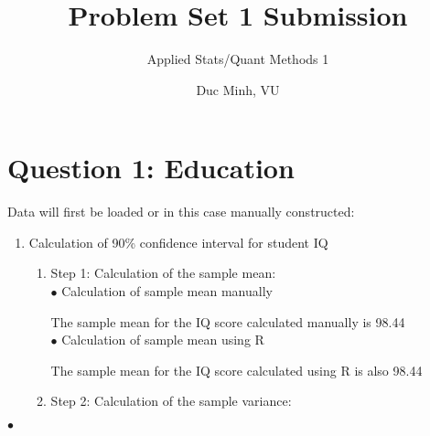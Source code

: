 \documentclass[12pt,letterpaper]{article}
\title{Problem Set 1 Submission}
\date{Duc Minh, VU}
\author{Applied Stats/Quant Methods 1}
\begin{document}
\maketitle
\section*{Question 1: Education}
\noindent Data will first be loaded or in this case manually constructed: 



\begin{enumerate} 
	\item Calculation of 90\% confidence interval for student IQ
	\begin{enumerate}
		\item Step 1: Calculation of the sample mean:\\
		$\bullet$ Calculation of sample mean manually
		
		The sample mean for the IQ score calculated manually is 98.44 \\
		$\bullet$ Calculation of sample mean using R
		
		The sample mean for the IQ score calculated using R is also 98.44
		\item Step 2: Calculation of the sample variance:\\
	\end{enumerate} 
\end{enumerate} 

$\bullet$ 
 
\end{document}
